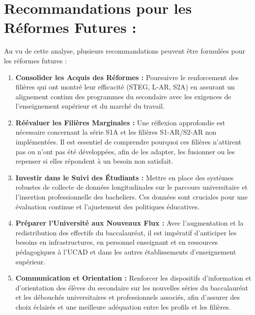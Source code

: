 \section*{Recommandations pour les Réformes Futures :}

Au vu de cette analyse, plusieurs recommandations peuvent être formulées pour les réformes futures :
\begin{enumerate}
    \item \textbf{Consolider les Acquis des Réformes :} Poursuivre le renforcement des filières qui ont montré leur efficacité (STEG, L-AR, S2A) en assurant un alignement continu des programmes du secondaire avec les exigences de l'enseignement supérieur et du marché du travail.
    \item \textbf{Réévaluer les Filières Marginales :} Une réflexion approfondie est nécessaire concernant la série S1A et les filières S1-AR/S2-AR non implémentées. Il est essentiel de comprendre pourquoi ces filières n'attirent pas ou n'ont pas été développées, afin de les adapter, les fusionner ou les repenser si elles répondent à un besoin non satisfait.
    \item \textbf{Investir dans le Suivi des Étudiants : }Mettre en place des systèmes robustes de collecte de données longitudinales sur le parcours universitaire et l'insertion professionnelle des bacheliers. Ces données sont cruciales pour une évaluation continue et l'ajustement des politiques éducatives.
    \item \textbf{Préparer l'Université aux Nouveaux Flux :} Avec l'augmentation et la redistribution des effectifs du baccalauréat, il est impératif d'anticiper les besoins en infrastructures, en personnel enseignant et en ressources pédagogiques à l'UCAD et dans les autres établissements d'enseignement supérieur.
    \item \textbf{Communication et Orientation :} Renforcer les dispositifs d'information et d'orientation des élèves du secondaire sur les nouvelles séries du baccalauréat et les débouchés universitaires et professionnels associés, afin d'assurer des choix éclairés et une meilleure adéquation entre les profils et les filières.
\end{enumerate}